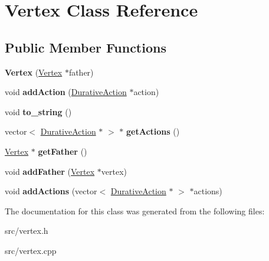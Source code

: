 \hypertarget{classVertex}{\section{Vertex Class Reference}
\label{classVertex}
}
\subsection*{Public Member Functions}
\begin{DoxyCompactItemize}
\item 
\hypertarget{classVertex_a7ab79d72fd7da5b17ad2a96687f28330}{{\bfseries Vertex} (\hyperlink{classVertex}{Vertex} $\ast$father)}\label{classVertex_a7ab79d72fd7da5b17ad2a96687f28330}

\item 
\hypertarget{classVertex_ae7d9984499c01b2c04fd16a2e2bc6d23}{void {\bfseries add\+Action} (\hyperlink{classDurativeAction}{Durative\+Action} $\ast$action)}\label{classVertex_ae7d9984499c01b2c04fd16a2e2bc6d23}

\item 
\hypertarget{classVertex_a699b688b71b89946ee95177d9764730d}{void {\bfseries to\+\_\+string} ()}\label{classVertex_a699b688b71b89946ee95177d9764730d}

\item 
\hypertarget{classVertex_a6046d6709f420cd4cfa70f8ec0198a42}{vector$<$ \hyperlink{classDurativeAction}{Durative\+Action} $\ast$ $>$ $\ast$ {\bfseries get\+Actions} ()}\label{classVertex_a6046d6709f420cd4cfa70f8ec0198a42}

\item 
\hypertarget{classVertex_a8c56826133130f0fe0438ca066b8d35d}{\hyperlink{classVertex}{Vertex} $\ast$ {\bfseries get\+Father} ()}\label{classVertex_a8c56826133130f0fe0438ca066b8d35d}

\item 
\hypertarget{classVertex_a3ef7d7808ca40ae8841824aa47bd2e70}{void {\bfseries add\+Father} (\hyperlink{classVertex}{Vertex} $\ast$vertex)}\label{classVertex_a3ef7d7808ca40ae8841824aa47bd2e70}

\item 
\hypertarget{classVertex_aa535b74f28ae6e847243d85c1c53fb5a}{void {\bfseries add\+Actions} (vector$<$ \hyperlink{classDurativeAction}{Durative\+Action} $\ast$ $>$ $\ast$actions)}\label{classVertex_aa535b74f28ae6e847243d85c1c53fb5a}

\end{DoxyCompactItemize}


The documentation for this class was generated from the following files\+:\begin{DoxyCompactItemize}
\item 
src/vertex.\+h\item 
src/vertex.\+cpp\end{DoxyCompactItemize}
